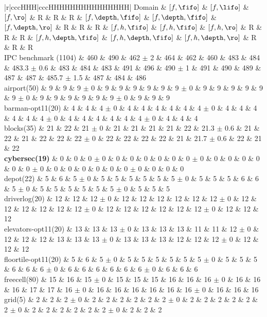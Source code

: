 \begin{center}
\begin{tabular}{|r|cccHHH|cccHHHHHHHHHHHHHHH|}
\hline
Domain & $[f,\fifo]$ & $[f,\lifo]$ & $[f,\ro]$ & R & R & R & $[f,\depth,\fifo]$ & $[f,\depth,\fifo]$ & $[f,\depth,\ro]$ & R & R & R & $[f,h,\fifo]$ & $[f,h,\fifo]$ & $[f,h,\ro]$ & R & R & R & $[f,h,\depth,\fifo]$ & $[f,h,\depth,\fifo]$ & $[f,h,\depth,\ro]$ & R & R & R\\
\hline
IPC benchmark (1104) & 460 & 490 & 462 $\pm$ 2 & 464 & 462 & 460 & 483 & 484 & 483.3 $\pm$ 0.6 & 483 & 484 & 483 & 491 & 496 & 490 $\pm$ 1 & 491 & 490 & 489 & 487 & 487 & 485.7 $\pm$ 1.5 & 487 & 484 & 486\\
\hline
airport(50) & 9 & 9 & 9 $\pm$ 0 & 9 & 9 & 9 & 9 & 9 & 9 $\pm$ 0 & 9 & 9 & 9 & 9 & 9 & 9 $\pm$ 0 & 9 & 9 & 9 & 9 & 9 & 9 $\pm$ 0 & 9 & 9 & 9\\
barman-opt11(20) & 4 & 4 & 4 $\pm$ 0 & 4 & 4 & 4 & 4 & 4 & 4 $\pm$ 0 & 4 & 4 & 4 & 4 & 4 & 4 $\pm$ 0 & 4 & 4 & 4 & 4 & 4 & 4 $\pm$ 0 & 4 & 4 & 4\\
blocks(35) & 21 & 22 & 21 $\pm$ 0 & 21 & 21 & 21 & 21 & 22 & 21.3 $\pm$ 0.6 & 21 & 22 & 21 & 22 & 22 & 22 $\pm$ 0 & 22 & 22 & 22 & 22 & 21 & 21.7 $\pm$ 0.6 & 22 & 21 & 22\\
\textbf{cybersec(19)} & 0 & 0 & 0 $\pm$ 0 & 0 & 0 & 0 & 0 & 0 & 0 $\pm$ 0 & 0 & 0 & 0 & 0 & 0 & 0 $\pm$ 0 & 0 & 0 & 0 & 0 & 0 & 0 $\pm$ 0 & 0 & 0 & 0\\
depot(22) & 5 & 6 & 5 $\pm$ 0 & 5 & 5 & 5 & 5 & 5 & 5 $\pm$ 0 & 5 & 5 & 5 & 6 & 6 & 5 $\pm$ 0 & 5 & 5 & 5 & 5 & 5 & 5 $\pm$ 0 & 5 & 5 & 5\\
driverlog(20) & 12 & 12 & 12 $\pm$ 0 & 12 & 12 & 12 & 12 & 12 & 12 $\pm$ 0 & 12 & 12 & 12 & 12 & 12 & 12 $\pm$ 0 & 12 & 12 & 12 & 12 & 12 & 12 $\pm$ 0 & 12 & 12 & 12\\
elevators-opt11(20) & 13 & 13 & 13 $\pm$ 0 & 13 & 13 & 13 & 11 & 11 & 12 $\pm$ 0 & 12 & 12 & 12 & 13 & 13 & 13 $\pm$ 0 & 13 & 13 & 13 & 12 & 12 & 12 $\pm$ 0 & 12 & 12 & 12\\
floortile-opt11(20) & 5 & 6 & 5 $\pm$ 0 & 5 & 5 & 5 & 5 & 5 & 5 $\pm$ 0 & 5 & 5 & 5 & 6 & 6 & 6 $\pm$ 0 & 6 & 6 & 6 & 6 & 6 & 6 $\pm$ 0 & 6 & 6 & 6\\
freecell(80) & 15 & 16 & 15 $\pm$ 0 & 15 & 15 & 15 & 16 & 16 & 16 $\pm$ 0 & 16 & 16 & 16 & 17 & 17 & 16 $\pm$ 0 & 16 & 16 & 16 & 16 & 16 & 16 $\pm$ 0 & 16 & 16 & 16\\
grid(5) & 2 & 2 & 2 $\pm$ 0 & 2 & 2 & 2 & 2 & 2 & 2 $\pm$ 0 & 2 & 2 & 2 & 2 & 2 & 2 $\pm$ 0 & 2 & 2 & 2 & 2 & 2 & 2 $\pm$ 0 & 2 & 2 & 2\\

\end{tabular}
\end{center}
